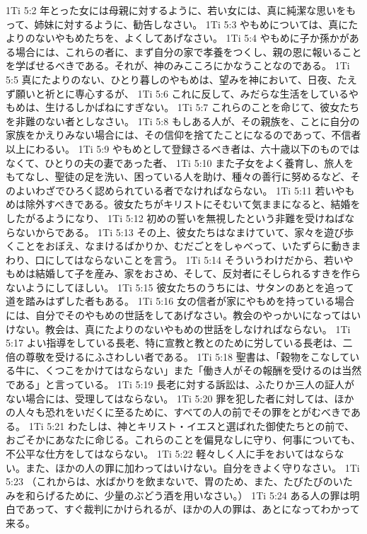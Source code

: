 1Ti 5:2  年とった女には母親に対するように、若い女には、真に純潔な思いをもって、姉妹に対するように、勧告しなさい。
1Ti 5:3  やもめについては、真にたよりのないやもめたちを、よくしてあげなさい。
1Ti 5:4  やもめに子か孫かがある場合には、これらの者に、まず自分の家で孝養をつくし、親の恩に報いることを学ばせるべきである。それが、神のみこころにかなうことなのである。
1Ti 5:5  真にたよりのない、ひとり暮しのやもめは、望みを神において、日夜、たえず願いと祈とに専心するが、
1Ti 5:6  これに反して、みだらな生活をしているやもめは、生けるしかばねにすぎない。
1Ti 5:7  これらのことを命じて、彼女たちを非難のない者としなさい。
1Ti 5:8  もしある人が、その親族を、ことに自分の家族をかえりみない場合には、その信仰を捨てたことになるのであって、不信者以上にわるい。
1Ti 5:9  やもめとして登録さるべき者は、六十歳以下のものではなくて、ひとりの夫の妻であった者、
1Ti 5:10  また子女をよく養育し、旅人をもてなし、聖徒の足を洗い、困っている人を助け、種々の善行に努めるなど、そのよいわざでひろく認められている者でなければならない。
1Ti 5:11  若いやもめは除外すべきである。彼女たちがキリストにそむいて気ままになると、結婚をしたがるようになり、
1Ti 5:12  初めの誓いを無視したという非難を受けねばならないからである。
1Ti 5:13  その上、彼女たちはなまけていて、家々を遊び歩くことをおぼえ、なまけるばかりか、むだごとをしゃべって、いたずらに動きまわり、口にしてはならないことを言う。
1Ti 5:14  そういうわけだから、若いやもめは結婚して子を産み、家をおさめ、そして、反対者にそしられるすきを作らないようにしてほしい。
1Ti 5:15  彼女たちのうちには、サタンのあとを追って道を踏みはずした者もある。
1Ti 5:16  女の信者が家にやもめを持っている場合には、自分でそのやもめの世話をしてあげなさい。教会のやっかいになってはいけない。教会は、真にたよりのないやもめの世話をしなければならない。
1Ti 5:17  よい指導をしている長老、特に宣教と教とのために労している長老は、二倍の尊敬を受けるにふさわしい者である。
1Ti 5:18  聖書は、「穀物をこなしている牛に、くつこをかけてはならない」また「働き人がその報酬を受けるのは当然である」と言っている。
1Ti 5:19  長老に対する訴訟は、ふたりか三人の証人がない場合には、受理してはならない。
1Ti 5:20  罪を犯した者に対しては、ほかの人々も恐れをいだくに至るために、すべての人の前でその罪をとがむべきである。
1Ti 5:21  わたしは、神とキリスト・イエスと選ばれた御使たちとの前で、おごそかにあなたに命じる。これらのことを偏見なしに守り、何事についても、不公平な仕方をしてはならない。
1Ti 5:22  軽々しく人に手をおいてはならない。また、ほかの人の罪に加わってはいけない。自分をきよく守りなさい。
1Ti 5:23  （これからは、水ばかりを飲まないで、胃のため、また、たびたびのいたみを和らげるために、少量のぶどう酒を用いなさい。）
1Ti 5:24  ある人の罪は明白であって、すぐ裁判にかけられるが、ほかの人の罪は、あとになってわかって来る。

